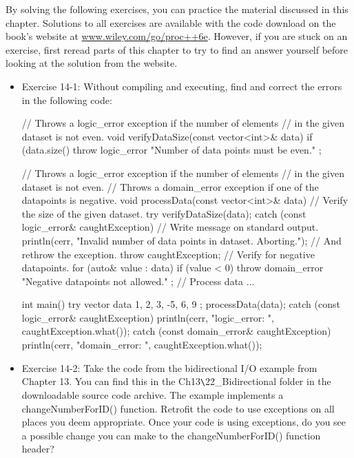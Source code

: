 By solving the following exercises, you can practice the material discussed in this chapter. Solutions to all exercises are available with the code download on the book’s website at \url{www.wiley.com/go/proc++6e}. However, if you are stuck on an exercise, first reread parts of this chapter to try to find an answer yourself before looking at the solution from the website.

\begin{itemize}
\item
Exercise 14-1: Without compiling and executing, find and correct the errors in the following code:

\begin{cpp}
// Throws a logic_error exception if the number of elements
// in the given dataset is not even.
void verifyDataSize(const vector<int>& data)
{
    if (data.size() %
        throw logic_error { "Number of data points must be even." };
}

// Throws a logic_error exception if the number of elements
// in the given dataset is not even.
// Throws a domain_error exception if one of the datapoints is negative.
void processData(const vector<int>& data)
{
    // Verify the size of the given dataset.
    try {
        verifyDataSize(data);
    } catch (const logic_error& caughtException) {
        // Write message on standard output.
        println(cerr, "Invalid number of data points in dataset. Aborting.");
        // And rethrow the exception.
        throw caughtException;
    }
    // Verify for negative datapoints.
    for (auto& value : data) {
        if (value < 0)
            throw domain_error { "Negative datapoints not allowed." };
    }
    // Process data ...
}

int main()
{
    try {
        vector data { 1, 2, 3, -5, 6, 9 };
        processData(data);
    } catch (const logic_error& caughtException) {
        println(cerr, "logic_error: {}", caughtException.what());
    } catch (const domain_error& caughtException) {
        println(cerr, "domain_error: {}", caughtException.what());
    }
}
\end{cpp}

\item
Exercise 14-2: Take the code from the bidirectional I/O example from Chapter 13. You can find this in the Ch13\verb|\|22\_Bidirectional folder in the downloadable source code archive. The example implements a changeNumberForID() function. Retrofit the code to use exceptions on all places you deem appropriate. Once your code is using exceptions, do you see a possible change you can make to the changeNumberForID() function header?


\end{itemize}
